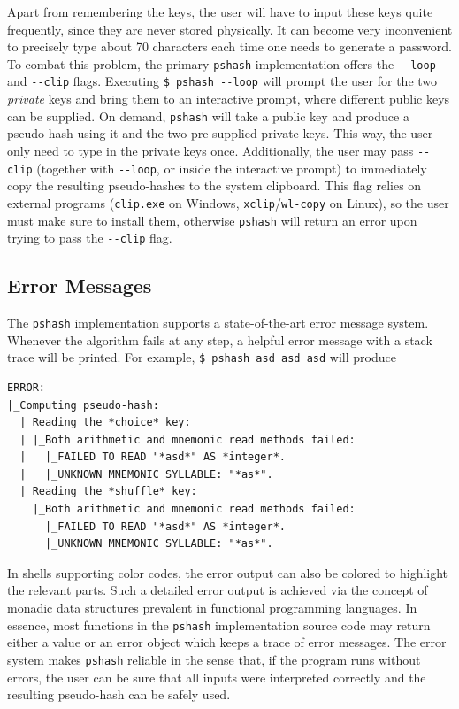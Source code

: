 \documentclass[a4paper, 10pt]{article}
\theoremstyle{plain}
\theoremstyle{definition}
\begin{document}
Apart from remembering the keys, the user will have to input these keys quite frequently, since they are never stored physically. It can become very inconvenient to precisely type about 70 characters each time one needs to generate a password. To combat this problem, the primary \texttt{pshash} implementation offers the \verb|--loop| and \verb|--clip| flags. Executing \verb|$ pshash --loop| will prompt the user for the two \textit{private} keys and bring them to an interactive prompt, where different public keys can be supplied. On demand, \texttt{pshash} will take a public key and produce a pseudo-hash using it and the two pre-supplied private keys. This way, the user only need to type in the private keys once. Additionally, the user may pass \verb|--clip| (together with \verb|--loop|, or inside the interactive prompt) to immediately copy the resulting pseudo-hashes to the system clipboard. This flag relies on external programs (\texttt{clip.exe} on Windows, \texttt{xclip}/\texttt{wl-copy} on Linux), so the user must make sure to install them, otherwise \texttt{pshash} will return an error upon trying to pass the \verb|--clip| flag.

\subsection{Error Messages}

The \texttt{pshash} implementation supports a state-of-the-art error message system. Whenever the algorithm fails at any step, a helpful error message with a stack trace will be printed. For example, \verb|$ pshash asd asd asd| will produce

\begin{verbatim}
ERROR:
|_Computing pseudo-hash:
  |_Reading the *choice* key:
  | |_Both arithmetic and mnemonic read methods failed:
  |   |_FAILED TO READ "*asd*" AS *integer*.
  |   |_UNKNOWN MNEMONIC SYLLABLE: "*as*".
  |_Reading the *shuffle* key:
    |_Both arithmetic and mnemonic read methods failed:
      |_FAILED TO READ "*asd*" AS *integer*.
      |_UNKNOWN MNEMONIC SYLLABLE: "*as*".
\end{verbatim}

In shells supporting color codes, the error output can also be colored to highlight the relevant parts. Such a detailed error output is achieved via the concept of monadic data structures prevalent in functional programming languages. In essence, most functions in the \texttt{pshash} implementation source code may return either a value or an error object which keeps a trace of error messages. The error system makes \texttt{pshash} reliable in the sense that, if the program runs without errors, the user can be sure that all inputs were interpreted correctly and the resulting pseudo-hash can be safely used.
\end{document}
